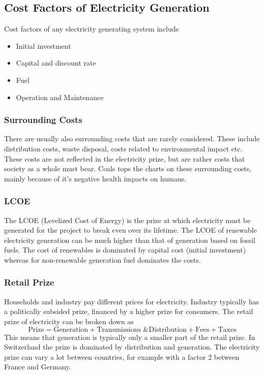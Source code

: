 \subsection{Cost Factors of Electricity Generation}

Cost factors of any electricity generating system include

\begin{itemize}
    \item Initial investment
    \item Capital and discount rate
    \item Fuel
    \item Operation and Maintenance
\end{itemize}

\subsubsection{Surrounding Costs}
There are usually also surrounding costs that are rarely considered. These include distribution costs, waste disposal, costs related to environmental impact etc.
These costs are not reflected in the electricity prize, but are rather costs that society as a whole must bear. Coals tops the charts on these surrounding costs, mainly because of it's negative health impacts on humans.\\

\subsubsection{LCOE}
The LCOE (Levelized Cost of Energy) is the prize at which electricity must be generated for the project to break even over its lifetime.
The LCOE of renewable electricity generation can be much higher than that of generation based on fossil fuels.
The cost of renewables is dominated by capital cost (initial investment) whereas for non-renewable generation fuel dominates the costs.

\subsubsection{Retail Prize}
Households and industry pay different prices for electricity.
Industry typically has a politically subsided prize, financed by a higher prize for consumers.
The retail prize of electricity can be broken down as
$$
\text{Prize} = \text{Generation} + \text{Transmissions \& Distribution} + \text{Fees} + \text{Taxes}
$$
This means that generation is typically only a smaller part of the retail prize.
In Switzerland the prize is dominated by distribution and generation. The electricity prize can vary a lot between countries, for example with a factor 2 between France and Germany.

